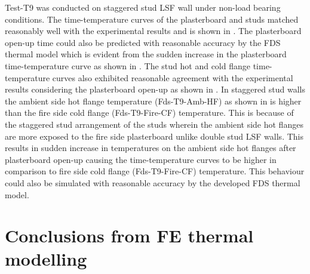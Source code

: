 Test-T9 was conducted on staggered stud LSF wall under non-load bearing conditions. The time-temperature curves of the plasterboard and studs matched reasonably well with the experimental results and is shown in . The plasterboard open-up time could also be predicted with reasonable accuracy by the FDS thermal model which is evident from the sudden increase in the plasterboard time-temperature curve as shown in . The stud hot and cold flange time-temperature curves also exhibited reasonable agreement with the experimental results considering the plasterboard open-up as shown in . In staggered stud walls the ambient side hot flange temperature (Fds-T9-Amb-HF) as shown in  is higher than the fire side cold flange (Fds-T9-Fire-CF) temperature. This is because of the staggered stud arrangement of the studs wherein the ambient side hot flanges are more exposed to the fire side plasterboard unlike double stud LSF walls. This results in sudden increase in temperatures on the ambient side hot flanges after plasterboard open-up causing the time-temperature curves to be higher in comparison to fire side cold flange (Fds-T9-Fire-CF) temperature. This behaviour could also be simulated with reasonable accuracy by the developed FDS thermal model. 

\section{Conclusions from FE thermal modelling}

